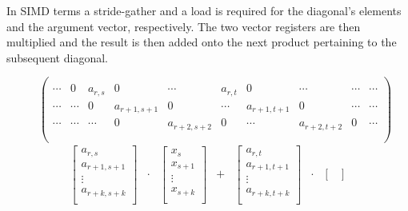 \documentclass{article}
\begin{document}
      In SIMD terms a stride-gather and a load is required for the diagonal's elements and the argument vector, respectively. The two vector registers are then multiplied and the result is then added onto the next product pertaining to the subsequent diagonal.

      \begin{figure}[ht]
        \centering
        $$
        \begin{pmatrix}
          \\
          \cdots & 0 & a_{r,s} & 0 & \cdots & a_{r,t} & 0 & \cdots & \cdots & \cdots \\
          \cdots & \cdots & 0 & a_{r+1,s+1} & 0 & \cdots & a_{r+1,t+1} & 0 & \cdots & \cdots \\
          \cdots & \cdots & \cdots & 0 & a_{r+2,s+2} & 0 & \cdots & a_{r+2,t+2} & 0 & \cdots \\
          \\
        \end{pmatrix}
        $$
        $$
        \begin{matrix}
          \begin{bmatrix}
            a_{r,s}     \\
            a_{r+1,s+1} \\
               \vdots   \\
            a_{r+k,s+k} \\
          \end{bmatrix} & \cdot & \begin{bmatrix}
                                    x_s      \\
                                    x_{s+1}  \\
                                      \vdots \\
                                    x_{s+k}  \\
                                  \end{bmatrix} & + & \begin{bmatrix}
                                                      a_{r,t}     \\
                                                      a_{r+1,t+1} \\
                                                        \vdots    \\
                                                      a_{r+k,t+k} \\
                                                      \end{bmatrix} & \cdot & \begin{bmatrix}

\end{bmatrix}
\end{matrix}$$
\end{figure}
\end{document}
